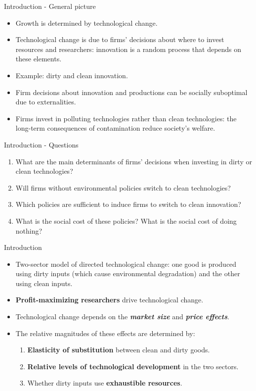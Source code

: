 \documentclass[aspectratio=169,xcolor=dvipsnames]{beamer}
\begin{document}
\begin{frame}{Introduction - General picture}
    \begin{itemize}
\item Growth is determined by technological change.
\item Technological change is due to firms' decisions about where to invest resources and researchers: innovation is a random process that depends on these elements.
\item Example: dirty and clean innovation. 
\item Firm decisions about innovation and productions can be socially suboptimal due to externalities.
\item Firms invest in polluting technologies rather than clean technologies: the long-term consequences of contamination reduce society's welfare.
    \end{itemize}
\end{frame}

\begin{frame}{Introduction - Questions}
\begin{enumerate}
\item What are the main determinants of firms' decisions when investing in dirty or clean technologies?
\item Will firms without environmental policies switch to clean technologies?
\item Which policies are sufficient to induce firms to switch to clean innovation?
\item What is the social cost of these policies? What is the social cost of doing nothing?
\end{enumerate}
\end{frame}


\begin{frame}{Introduction}
\begin{itemize}
\item Two-sector model of directed technological change: one good is produced using dirty inputs (which cause environmental degradation) and the other using clean inputs.
\item \textbf{Profit-maximizing researchers} drive technological change.
\item Technological change depends on the \textbf{\textit{market size}} and \textbf{\textit{price effects}}.
\item The relative magnitudes of these effects are determined by:
    \begin{enumerate}
\item \textbf{Elasticity of substitution} between clean and dirty goods.
\item \textbf{Relative levels of technological development} in the two sectors.
\item Whether dirty inputs use \textbf{exhaustible resources}.
    \end{enumerate}
\end{itemize}
\end{frame}
\end{document}

